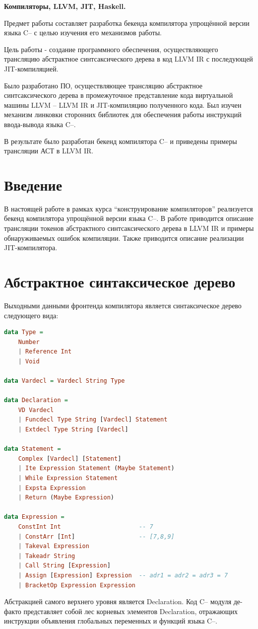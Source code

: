 \documentclass[a4paper,12pt]{report}
\numberwithin{equation}{section}
\begin{document}
\noindent \textbf{Компиляторы, LLVM, JIT, Haskell.} 

Предмет работы составляет разработка бекенда компилятора упрощённой версии языка C-- с целью изучения его механизмов работы.

Цель работы - создание программного обеспечения, осуществляющего трансляцию абстрактное синтсаксического дерева в код LLVM IR с последующей JIT-компиляцией. 

Было разработано ПО, осуществляющее трансляцию абстрактное синтсаксического дерева в промежуточное представление кода виртуальной машины LLVM -- LLVM IR и
JIT-компиляцию полученного кода. Был изучен механизм линковки сторонних библиотек для обеспечения работы инструкций ввода-вывода языка C--.

В результате было разработан бекенд компилятора C-- и приведены примеры трансляции АСТ в LLVM IR.

\tableofcontents

\section{Введение}
В настоящей работе в рамках курса ``конструирование компиляторов'' реализуется бекенд компилятора упрощённой версии языка C--.
В работе приводится описание трансляции токенов абстрактного синтсаксического дерева в LLVM IR и примеры обнаруживаемых ошибок компиляции. Также приводится описание реализации JIT-компилятора.

\section{Абстрактное синтаксическое дерево}
Выходными данными фронтенда компилятора является синтаксическое дерево следующего вида:
\begin{lstlisting}[language=Haskell]
data Type = 
    Number 
    | Reference Int 
    | Void

data Vardecl = Vardecl String Type

data Declaration = 
    VD Vardecl
    | Funcdecl Type String [Vardecl] Statement
    | Extdecl Type String [Vardecl] 
    
data Statement =
    Complex [Vardecl] [Statement]
    | Ite Expression Statement (Maybe Statement)
    | While Expression Statement
    | Expsta Expression
    | Return (Maybe Expression)
    
data Expression =
    ConstInt Int                      -- 7
    | ConstArr [Int]                  -- [7,8,9]
    | Takeval Expression              
    | Takeadr String                  
    | Call String [Expression]  
    | Assign [Expression] Expression  -- adr1 = adr2 = adr3 = 7
    | BracketOp Expression Expression
\end{lstlisting}
Абстракцией самого верхнего уровня является Declaration. Код C-- модуля де-факто представляет собой лес корневых элементов Declaration, отражающих инструкции объявления глобальных переменных и функций языка C--. 
\end{document}
